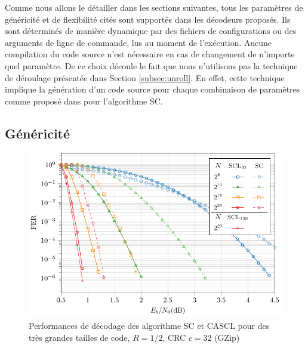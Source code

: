 Comme nous allons le détailler dans les sections suivantes, tous les paramètres de généricité et de flexibilité cités sont supportés dans les décodeurs proposés. Ils sont déterminés de manière dynamique par des fichiers de configurations ou des arguments de ligne de commande, lus au moment de l'exécution. Aucune compilation du code source n'est nécessaire en cas de changement de n'importe quel paramètre. De ce choix découle le fait que nous n'utilisons pas la technique de déroulage présentée dans Section \ref{subsec:unroll}. En effet, cette technique implique la génération d'un code source pour chaque combinaison de paramètres comme proposé dans \cite{sarkis_autogenerating_2014} pour l'algorithme SC.

\subsection{Généricité}

\begin{figure}[t]
\includegraphics[width=\textwidth]{main/ch2_fig/curves/code/tikz/code}
\caption{Performances de décodage des algorithme SC et CASCL pour des très grandes tailles de code, $R=1/2$, CRC $c=32$ (GZip)}
\label{fig:large_scl}
\end{figure}

